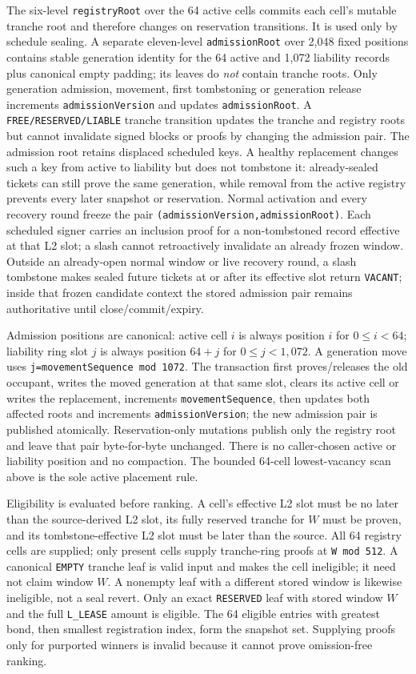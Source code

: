 \documentclass[a4paper,11pt]{article}
\newcommand{\code}[1]{\nolinkurl{#1}}
\begin{document}
The six-level \code{registryRoot} over the 64 active cells commits each cell's
mutable tranche root and therefore changes on reservation transitions.  It is
used only by schedule sealing.  A separate eleven-level \code{admissionRoot}
over 2,048 fixed positions contains stable generation identity for the 64
active and 1,072 liability records plus canonical empty padding; its leaves do
\emph{not} contain tranche roots.  Only generation admission, movement, first
tombstoning or generation release increments \code{admissionVersion} and updates
\code{admissionRoot}.  A \code{FREE/RESERVED/LIABLE} tranche transition updates
the tranche and registry roots but cannot invalidate signed blocks or proofs by
changing the admission pair.  The admission root retains displaced scheduled
keys.  A healthy replacement changes such a key from active to liability but
does not tombstone it: already-sealed tickets can still prove the same
generation, while removal from the active registry prevents every later
snapshot or reservation.  Normal activation and every recovery round freeze
the pair \code{(admissionVersion,admissionRoot)}.  Each scheduled signer carries
an inclusion proof for a non-tombstoned record effective at that L2 slot; a
slash cannot retroactively invalidate an already frozen window.
Outside an already-open normal window or live recovery round, a slash tombstone makes
sealed future tickets at or after its effective slot return \code{VACANT};
inside that frozen candidate context the stored admission pair remains
authoritative until close/commit/expiry.

Admission positions are canonical: active cell $i$ is always position $i$ for
$0\le i<64$; liability ring slot $j$ is always position $64+j$ for
$0\le j<1,072$.  A generation move uses
\code{j=movementSequence mod 1072}.  The transaction first proves/releases the
old occupant, writes the moved generation at that same slot, clears its active
cell or writes the replacement, increments \code{movementSequence}, then
updates both affected roots and increments \code{admissionVersion}; the new
admission pair is published atomically.  Reservation-only mutations publish
only the registry root and leave that pair byte-for-byte unchanged.
There is no caller-chosen active or liability position and no compaction.  The
bounded 64-cell lowest-vacancy scan above is the sole active placement rule.

Eligibility is evaluated before ranking.  A cell's effective L2 slot must be no
later than the source-derived L2 slot, its fully reserved tranche for $W$ must
be proven, and its tombstone-effective L2 slot must be later than the source.
All 64 registry cells are supplied; only present cells supply tranche-ring
proofs at \code{W mod 512}.  A canonical \code{EMPTY} tranche leaf is valid input and makes the cell
ineligible; it need not claim window $W$.  A nonempty leaf with a different
stored window is likewise ineligible, not a seal revert.  Only an exact
\code{RESERVED} leaf with stored window $W$ and the full \code{L_LEASE} amount
is eligible.  The 64 eligible
entries with greatest bond, then smallest registration index, form the snapshot
set.  Supplying proofs only for purported winners is invalid because it cannot
prove omission-free ranking.
\end{document}
